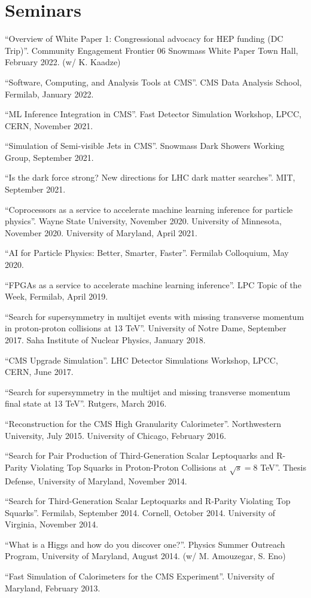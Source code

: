 \section{Seminars}
\begin{description}[leftmargin=12pt,font=\normalfont,labelsep=0em]
\item ``Overview of White Paper 1: Congressional advocacy for HEP funding (DC Trip)''. Community Engagement Frontier 06 Snowmass White Paper Town Hall, February 2022. (w/ K. Kaadze)
\item ``Software, Computing, and Analysis Tools at CMS''. CMS Data Analysis School, Fermilab, January 2022.
\item ``ML Inference Integration in CMS''. Fast Detector Simulation Workshop, LPCC, CERN, November 2021.
\item ``Simulation of Semi-visible Jets in CMS''. Snowmass Dark Showers Working Group, September 2021.
\item ``Is the dark force strong? New directions for LHC dark matter searches''. MIT, September 2021.
\item ``Coprocessors as a service to accelerate machine learning inference for particle physics''. Wayne State University, November 2020. University of Minnesota, November 2020. University of Maryland, April 2021.
\item ``AI for Particle Physics: Better, Smarter, Faster''. Fermilab Colloquium, May 2020.
\item ``FPGAs as a service to accelerate machine learning inference''. LPC Topic of the Week, Fermilab, April 2019.
\item ``Search for supersymmetry in multijet events with missing transverse momentum in proton-proton collisions at 13 TeV''. University of Notre Dame, September 2017. Saha Institute of Nuclear Physics, January 2018.
\item ``CMS Upgrade Simulation''. LHC Detector Simulations Workshop, LPCC, CERN, June 2017.
\item ``Search for supersymmetry in the multijet and missing transverse momentum final state at 13 TeV''. Rutgers, March 2016.
\item ``Reconstruction for the CMS High Granularity Calorimeter''. Northwestern University, July 2015. University of Chicago, February 2016.
\item ``Search for Pair Production of Third-Generation Scalar Leptoquarks and R-Parity Violating Top Squarks in Proton-Proton Collisions at $\sqrt{s}=8$ TeV''. Thesis Defense, University of Maryland, November 2014.
\item ``Search for Third-Generation Scalar Leptoquarks and R-Parity Violating Top Squarks''. Fermilab, September 2014. Cornell, October 2014. University of Virginia, November 2014.
\item ``What is a Higgs and how do you discover one?''. Physics Summer Outreach Program, University of Maryland, August 2014. (w/ M. Amouzegar, S. Eno)
\item ``Fast Simulation of Calorimeters for the CMS Experiment''. University of Maryland, February 2013.
\end{description}

